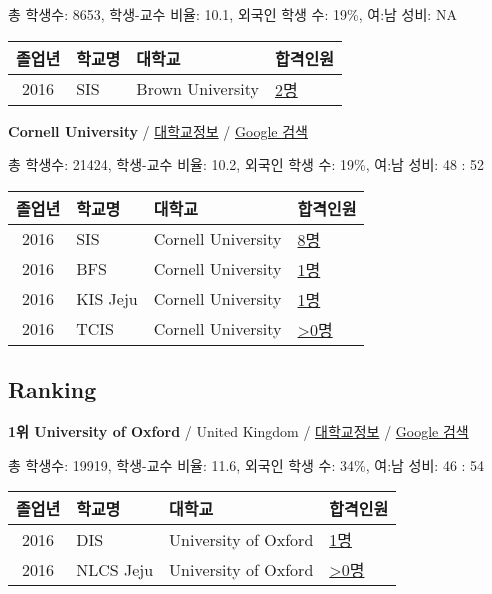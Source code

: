 \documentclass[13pt,]{article}
\begin{document}
총 학생수: 8653, 학생-교수 비율: 10.1, 외국인 학생 수: 19\%, 여:남 성비:
NA

\begin{longtable}[]{@{}clll@{}}
\toprule
졸업년 & 학교명 & 대학교 & 합격인원\tabularnewline
\midrule
\endhead
2016 & SIS & Brown University &
\href{http://cafe.naver.com/assarabia/11589}{2명}\tabularnewline
\bottomrule
\end{longtable}

\textbf{Cornell University} /
\href{https://www.timeshighereducation.com/world-university-rankings/cornell-university?ranking-dataset=589595}{대학교정보}
/ \href{http://www.google.com/search?q=Cornell+University}{Google 검색}

총 학생수: 21424, 학생-교수 비율: 10.2, 외국인 학생 수: 19\%, 여:남
성비: 48 : 52

\begin{longtable}[]{@{}clll@{}}
\toprule
졸업년 & 학교명 & 대학교 & 합격인원\tabularnewline
\midrule
\endhead
2016 & SIS & Cornell University &
\href{http://cafe.naver.com/assarabia/11589}{8명}\tabularnewline
2016 & BFS & Cornell University &
\href{http://cafe.naver.com/assarabia/11597}{1명}\tabularnewline
2016 & KIS Jeju & Cornell University &
\href{http://cafe.naver.com/assarabia/11596}{1명}\tabularnewline
2016 & TCIS & Cornell University &
\href{http://cafe.naver.com/assarabia/11598}{\textgreater{}0명}\tabularnewline
\bottomrule
\end{longtable}

\subsection{Ranking}\label{ranking}

\textbf{1위 University of Oxford} / United Kingdom /
\href{https://www.timeshighereducation.com/world-university-rankings/university-of-oxford?ranking-dataset=589595}{대학교정보}
/ \href{http://www.google.com/search?q=University+of+Oxford}{Google
검색}

총 학생수: 19919, 학생-교수 비율: 11.6, 외국인 학생 수: 34\%, 여:남
성비: 46 : 54

\begin{longtable}[]{@{}clll@{}}
\toprule
졸업년 & 학교명 & 대학교 & 합격인원\tabularnewline
\midrule
\endhead
2016 & DIS & University of Oxford &
\href{http://cafe.naver.com/assarabia/11591}{1명}\tabularnewline
2016 & NLCS Jeju & University of Oxford &
\href{http://cafe.naver.com/assarabia/11592}{\textgreater{}0명}\tabularnewline
\bottomrule
\end{longtable}
\end{document}
